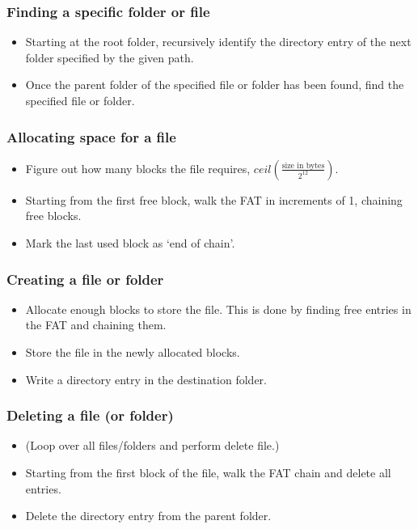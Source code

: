 \documentclass[a4paper,12pt]{article}
\begin{document}
\subsubsection{Finding a specific folder or file}\label{finding-a-specific-folder-or-file}
    \begin{itemize}
        \itemsep1pt\parskip0pt
        \item{Starting at the root folder, recursively identify the directory entry}
          of the next folder specified by the given path.
        \item{Once the parent folder of the specified file or folder has been found,}
          find the specified file or folder.
    \end{itemize}

\subsubsection{Allocating space for a file}\label{allocating-space-for-a-file}
    \begin{itemize}
        \itemsep1pt\parskip0pt
        \item{Figure out how many blocks the file requires,}
          $ceil(\frac{\text{size in bytes}}{2^{12}})$.
        \item{Starting from the first free block, walk the FAT in increments of 1, chaining free blocks.}
        \item{Mark the last used block as `end of chain'.}
    \end{itemize}

\subsubsection{Creating a file or folder}\label{creating-a-file-or-folder}
    \begin{itemize}
        \itemsep1pt\parskip0pt
        \item{Allocate enough blocks to store the file. This is done by finding free entries in the FAT and chaining them.}
        \item{Store the file in the newly allocated blocks.}
        \item{Write a directory entry in the destination folder.}
    \end{itemize}

\subsubsection{Deleting a file (or folder)}\label{deleting-a-file-or-folder}
    \begin{itemize}
        \itemsep1pt\parskip0pt
        \item{(Loop over all files/folders and perform delete file.)}
        \item{Starting from the first block of the file, walk the FAT chain and delete all entries.}
        \item{Delete the directory entry from the parent folder.}
    \end{itemize}
\end{document}
